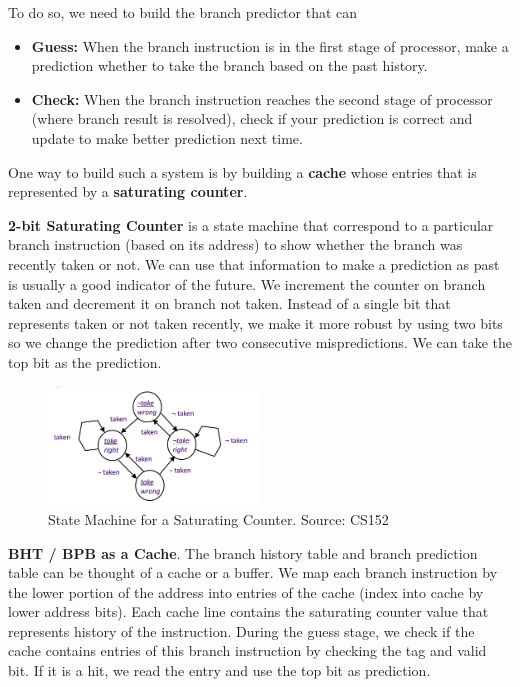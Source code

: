 \documentclass[11pt]{article}
\begin{document}
To do so, we need to build the branch predictor that can 
\begin{itemize}
    \item \textbf{Guess:} When the branch instruction is in the first stage of processor, make a prediction whether to take the branch based on the past history.
    \item \textbf{Check:} When the branch instruction reaches the second stage of processor (where branch result is resolved), check if your prediction is correct and update to make better prediction next time.
\end{itemize}

One way to build such a system is by building a \textbf{cache} whose entries that is represented by a \textbf{saturating counter}. 

\textbf{2-bit Saturating Counter} is a state machine that correspond to a particular branch instruction (based on its address) to show whether the branch was recently taken or not. We can use that information to make a prediction as past is usually a good indicator of the future. We increment the counter on branch taken and decrement it on branch not taken. Instead of a single bit that represents taken or not taken recently, we make it more robust by using two bits so we change the prediction after two consecutive mispredictions. We can take the top bit as the prediction. 

\begin{figure}[hbt]
\begin{center}
\includegraphics[width=0.5\textwidth]{images/saturating_counter.png}

\caption{State Machine for a Saturating Counter. Source: CS152}
\end{center}
\end{figure}


\newpage
\textbf{BHT / BPB as a Cache}. The branch history table and branch prediction table can be thought of a cache or a buffer. We map each branch instruction by the lower portion of the address into entries of the cache (index into cache by lower address bits). Each cache line contains the saturating counter value that represents history of the instruction. During the guess stage, we check if the cache contains entries of this branch instruction by checking the tag and valid bit. If it is a hit, we read the entry and use the top bit as prediction. 
\end{document}
